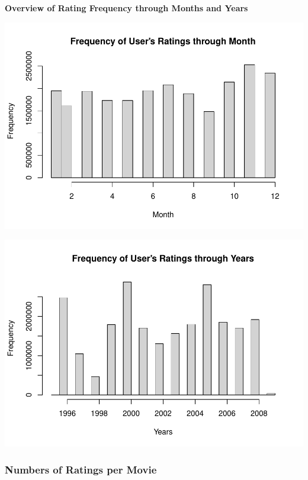 \documentclass[
]{article}
\begin{document}
\textbf{Overview of Rating Frequency through Months and Years}

\begin{center}\includegraphics{MovieLens-Project-Report_files/figure-latex/unnamed-chunk-18-1} \end{center}

\begin{center}\includegraphics{MovieLens-Project-Report_files/figure-latex/unnamed-chunk-18-2} \end{center}

\hypertarget{numbers-of-ratings-per-movie}{%
\subsubsection{Numbers of Ratings per
Movie}\label{numbers-of-ratings-per-movie}}
\end{document}
